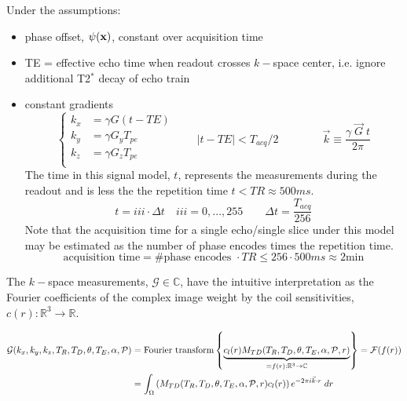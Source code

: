 \documentclass{article}         %
\theoremstyle{definition}
\theoremstyle{remark}
\begin{document}
Under the assumptions:
\begin{itemize} 
 \item phase offset, $\psi(\mathbf{x})$, constant over acquisition time 
 \item TE = effective echo time when readout crosses $k-$space center, i.e.  ignore additional
       T2$^*$ decay of echo train
 \item constant gradients 
        \[ \left\{
             \begin{split}
           k_x & = \gamma G (t - TE) \\
           k_y & = \gamma  G_y T_{pe} \\
           k_z & = \gamma  G_z T_{pe} \\
           \end{split}
           \right. \qquad
          |t-TE| < T_{acq}/2
          \qquad \qquad
          \vec{k} \equiv \frac{\gamma \; \vec{G} \; t}{2 \pi}
        \]
The time in this signal model, $t$, represents the measurements during
the readout and is less the the repetition time $t < TR \approx 500ms$.
\[
  t =  iii \cdot \Delta t \quad iii = 0, ..., 255
\qquad 
  \Delta t = \frac{T_{acq}}{256} 
\]
Note that the acquisition time for a single echo/single slice under this model may be
estimated as the number of phase encodes times the repetition time.
\[
   \text{acquisition time} = \# \text{phase encodes } \cdot TR 
                           \leq 256 \cdot 500ms \approx 2 \text{min}
\]

\end{itemize} 

The $k-$space measurements, $\mathcal{G} \in \mathbb{C}$, have the intuitive interpretation
as the Fourier coefficients of the complex image weight by the
coil sensitivities, $c(r):  \mathbb{R}^3 \rightarrow \mathbb{R}$.
 
\begin{equation}
\label{FFTmultiecho}
\begin{split}
\mathcal{G}(k_x,k_y,k_z,T_R,T_D,\theta,T_E,\alpha,\mathcal{P}) 
  & = \text{Fourier transform} \left\{ \underbrace{c_l(r) M_{TD}(T_R,T_D,\theta,T_E,\alpha,\mathcal{P},r) }_{\equiv f(r):\mathbb{R}^3 \rightarrow \mathbb{C} } \right\}
          = \mathcal{F}(f(r))
\\
 & = \int_\Omega \left(M_{TD}(T_R,T_D,\theta,T_E,\alpha,\mathcal{P},r)c_l(r)  \right)
          e^{-2  \pi i \vec{k}  \cdot r } \; dr
\end{split}
\end{equation}
\end{document}
